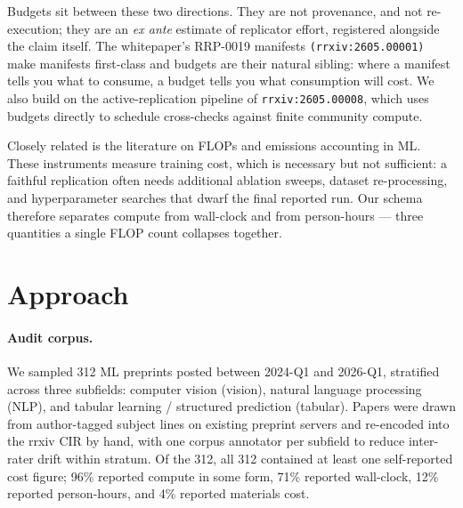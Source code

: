 \documentclass{rrxiv}
\begin{document}
Budgets sit between these two directions. They are not provenance, and not re-execution; they are an \emph{ex ante} estimate of replicator effort, registered alongside the claim itself. The whitepaper's RRP-0019 manifests \texttt{(rrxiv:2605.00001)} make manifests first-class and budgets are their natural sibling: where a manifest tells you what to consume, a budget tells you what consumption will cost. We also build on the active-replication pipeline of \texttt{rrxiv:2605.00008}, which uses budgets directly to schedule cross-checks against finite community compute.

Closely related is the literature on FLOPs and emissions accounting in ML. These instruments measure training cost, which is necessary but not sufficient: a faithful replication often needs additional ablation sweeps, dataset re-processing, and hyperparameter searches that dwarf the final reported run. Our schema therefore separates compute from wall-clock and from person-hours --- three quantities a single FLOP count collapses together.

\section{Approach}\label{sec:approach}

\paragraph{Audit corpus.} We sampled 312 ML preprints posted between 2024-Q1 and 2026-Q1, stratified across three subfields: computer vision (vision), natural language processing (NLP), and tabular learning / structured prediction (tabular). Papers were drawn from author-tagged subject lines on existing preprint servers and re-encoded into the rrxiv CIR by hand, with one corpus annotator per subfield to reduce inter-rater drift within stratum. Of the 312, all 312 contained at least one self-reported cost figure; 96\% reported compute in some form, 71\% reported wall-clock, 12\% reported person-hours, and 4\% reported materials cost.
\end{document}
